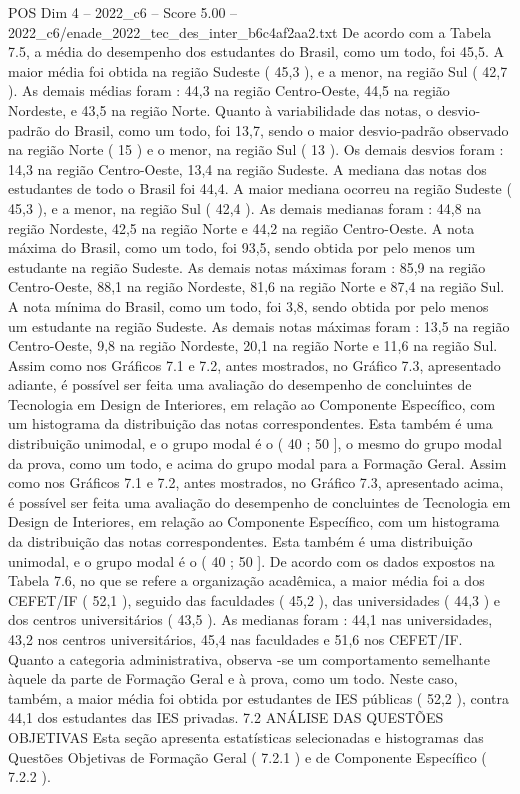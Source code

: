 \begin{textsample}{POS Dim 4 – 2022\_c6 – Score 5.00 – 2022\_c6/enade\_2022\_tec\_des\_inter\_b6c4af2aa2.txt}
De acordo com a Tabela 7.5, a média do desempenho dos estudantes do Brasil, como um todo, foi 45,5.
A maior média foi obtida na região Sudeste ( 45,3 ), e a menor, na região Sul ( 42,7 ).
As demais médias foram : 44,3 na região Centro-Oeste, 44,5 na região Nordeste, e 43,5 na região Norte.
Quanto à variabilidade das notas, o desvio-padrão do Brasil, como um todo, foi 13,7, sendo o maior desvio-padrão observado na região Norte ( 15 ) e o menor, na região Sul ( 13 ).
Os demais desvios foram : 14,3 na região Centro-Oeste, 13,4 na região Sudeste.
A mediana das notas dos estudantes de todo o Brasil foi 44,4.
A maior mediana ocorreu na região Sudeste ( 45,3 ), e a menor, na região Sul ( 42,4 ).
As demais medianas foram : 44,8 na região Nordeste, 42,5 na região Norte e 44,2 na região Centro-Oeste.
A nota máxima do Brasil, como um todo, foi 93,5, sendo obtida por pelo menos um estudante na região Sudeste.
As demais notas máximas foram : 85,9 na região Centro-Oeste, 88,1 na região Nordeste, 81,6 na região Norte e 87,4 na região Sul.
A nota mínima do Brasil, como um todo, foi 3,8, sendo obtida por pelo menos um estudante na região Sudeste.
As demais notas máximas foram : 13,5 na região Centro-Oeste, 9,8 na região Nordeste, 20,1 na região Norte e 11,6 na região Sul.
Assim como nos Gráficos 7.1 e 7.2, antes mostrados, no Gráfico 7.3, apresentado adiante, é possível ser feita uma avaliação do desempenho de concluintes de Tecnologia em Design de Interiores, em relação ao Componente Específico, com um histograma da distribuição das notas correspondentes.
Esta também é uma distribuição unimodal, e o grupo modal é o ( 40 ; 50 ], o mesmo do grupo modal da prova, como um todo, e acima do grupo modal para a Formação Geral.
Assim como nos Gráficos 7.1 e 7.2, antes mostrados, no Gráfico 7.3, apresentado acima, é possível ser feita uma avaliação do desempenho de concluintes de Tecnologia em Design de Interiores, em relação ao Componente Específico, com um histograma da distribuição das notas correspondentes.
Esta também é uma distribuição unimodal, e o grupo modal é o ( 40 ; 50 ].
De acordo com os dados expostos na Tabela 7.6, no que se refere a organização acadêmica, a maior média foi a dos CEFET/IF ( 52,1 ), seguido das faculdades ( 45,2 ), das universidades ( 44,3 ) e dos centros universitários ( 43,5 ).
As medianas foram : 44,1 nas universidades, 43,2 nos centros universitários, 45,4 nas faculdades e 51,6 nos CEFET/IF.
Quanto a categoria administrativa, observa -se um comportamento semelhante àquele da parte de Formação Geral e à prova, como um todo.
Neste caso, também, a maior média foi obtida por estudantes de IES públicas ( 52,2 ), contra 44,1 dos estudantes das IES privadas. 7.2 ANÁLISE DAS QUESTÕES OBJETIVAS Esta seção apresenta estatísticas selecionadas e histogramas das Questões Objetivas de Formação Geral ( 7.2.1 ) e de Componente Específico ( 7.2.2 ).

\end{textsample}
